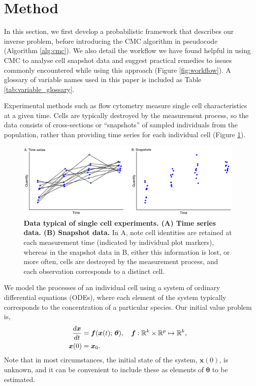 \section{Method}\label{sec:method}
In this section, we first develop a probabilistic framework that describes our inverse problem, before introducing the CMC algorithm in pseudocode (Algorithm \ref{alg:cmc}). We also detail the workflow we have found helpful in using CMC to analyse cell snapshot data and suggest practical remedies to issues commonly encountered while using this approach (Figure \ref{fig:workflow}). A glossary of variable names used in this paper is included as Table \ref{tab:variable_glossary}.

Experimental methods such as flow cytometry measure single cell characteristics at a given time. Cells are typically destroyed by the measurement process, so the data consists of cross-sections or ``snapshots'' of sampled individuals from the population, rather than providing time series for each individual cell (Figure \ref{fig:time_series_v_snapshots}).

\begin{figure}[H]
  \centerline{\includegraphics[width=\textwidth]{../figures/time_series_v_snapshots.pdf}}
  \caption{\textbf{Data typical of single cell experiments. (A) Time series data. (B) Snapshot data.} In A, note cell identities are retained at each measurement time (indicated by individual plot markers), whereas in the snapshot data in B, either this information is lost, or more often, cells are destroyed by the measurement process, and each observation corresponds to a distinct cell.}
  \label{fig:time_series_v_snapshots}
\end{figure}

We model the processes of an individual cell using a system of ordinary differential equations (ODEs), where each element of the system typically corresponds to the concentration of a particular species. Our initial value problem is,
%
\begin{equation}\label{eq:ode}
\begin{aligned}
\frac{d\boldsymbol{x}}{dt} &= \boldsymbol{f}(\boldsymbol{x}(t); \, \boldsymbol{\theta}), \quad \boldsymbol{f}: \mathbb{R}^k \times \mathbb{R}^p \mapsto \mathbb{R}^k, \\
\boldsymbol{x}(0) &= \boldsymbol{x}_0.
\end{aligned}
\end{equation}
%
Note that in most circumstances, the initial state of the system, $\boldsymbol{x}(0)$, is unknown, and it can be convenient to include these as elements of $\boldsymbol{\theta}$ to be estimated.

